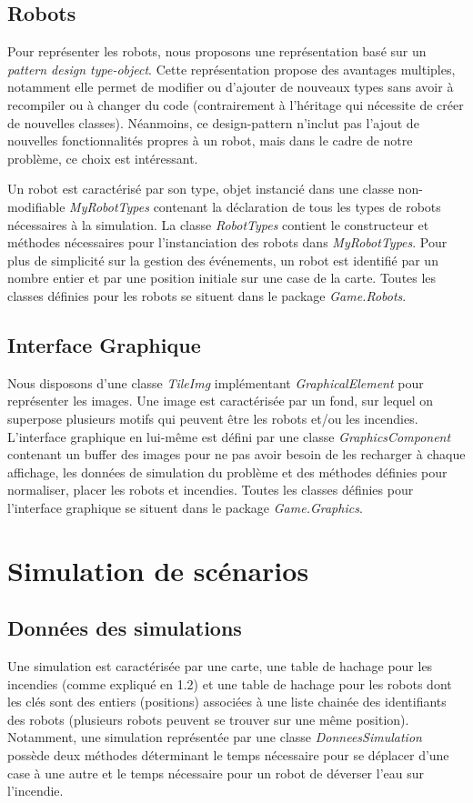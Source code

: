 \documentclass[a4paper, 10pt, french]{article}
\begin{document}
	\subsection{Robots}
	Pour représenter les robots, nous proposons une représentation basé sur un {\it pattern design type-object}. Cette représentation propose des avantages multiples, notamment elle permet de modifier ou d'ajouter de nouveaux types sans avoir à recompiler ou à changer du code (contrairement à l'héritage qui nécessite de créer de nouvelles classes). Néanmoins, ce design-pattern n'inclut pas l'ajout de nouvelles fonctionnalités propres à un robot, mais dans le cadre de notre problème, ce choix est intéressant.
	\par\leavevmode\par
	Un robot est caractérisé par son type, objet instancié dans une classe non-modifiable {\it MyRobotTypes} contenant la déclaration de tous les types de robots nécessaires à la simulation. La classe {\it RobotTypes} contient le constructeur et méthodes nécessaires pour l'instanciation des robots dans {\it MyRobotTypes}. Pour plus de simplicité sur la gestion des événements, un robot est identifié par un nombre entier et par une position initiale sur une case de la carte. Toutes les classes définies pour les robots se situent dans le package {\it Game.Robots}.

	\subsection{Interface Graphique}
	Nous disposons d'une classe {\it TileImg} implémentant {\it GraphicalElement} pour représenter les images. Une image est caractérisée par un fond, sur lequel on superpose plusieurs motifs qui peuvent être les robots et/ou les incendies. L'interface graphique en lui-même est défini par une classe {\it GraphicsComponent} contenant un buffer des images pour ne pas avoir besoin de les recharger à chaque affichage, les données de simulation du problème et des méthodes définies pour normaliser, placer les robots et incendies. Toutes les classes définies pour l'interface graphique se situent dans le package {\it Game.Graphics}.

\section{Simulation de scénarios}

	\subsection{Données des simulations}
	Une simulation est caractérisée par une carte, une table de hachage pour les incendies (comme expliqué en 1.2) et une table de hachage pour les robots dont les clés sont des entiers (positions) associées à une liste chainée des identifiants des robots (plusieurs robots peuvent se trouver sur une même position). Notamment, une simulation représentée par une classe {\it DonneesSimulation} possède deux méthodes déterminant le temps nécessaire pour se déplacer d'une case à une autre et le temps nécessaire pour un robot de déverser l'eau sur l'incendie.
	
\end{document}
